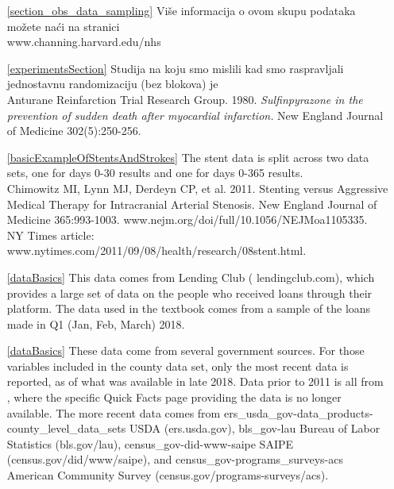 {\begin{itemize}
	\item[\ref{section_obs_data_sampling}]
	Više informacija o ovom skupu podataka možete naći na stranici \\
	{www.channing.harvard.edu/nhs}

	\item[\ref{experimentsSection}]
	Studija na koju smo mislili kad smo raspravljali
	jednostavnu randomizaciju (bez blokova) je \\
	Anturane Reinfarction Trial Research Group. 1980.
	\emph{Sulfinpyrazone in the prevention of sudden
		death after myocardial infarction.}
	New England Journal of Medicine 302(5):250-256.
\end{itemize}
}{%
\begin{itemize}
	\setlength{\itemsep}{0mm}
	\item[\ref{basicExampleOfStentsAndStrokes}]
	The stent data is split across two data sets,
	one for days 0-30 results and one for days 0-365
	results. \\
	Chimowitz MI, Lynn MJ, Derdeyn CP, et al. 2011.
	Stenting versus Aggressive Medical Therapy for
	Intracranial Arterial Stenosis.
	New England Journal of Medicine 365:993-1003.
	{www.nejm.org/doi/full/10.1056/NEJMoa1105335}. \\
	NY Times article:
	{www.nytimes.com/2011/09/08/health/research/08stent.html}.

	\item[\ref{dataBasics}]
	This data comes from Lending Club
	(
	{lendingclub.com}),
	which provides a large set of data on the people who
	received loans through their platform.
	The data used in the textbook comes from a sample
	of the loans made in Q1 (Jan, Feb, March) 2018.
	\item[\ref{dataBasics}]
	These data come from several government sources.
	For those variables included in the
	county data set, only the most recent data is reported,
	as of what was available in late 2018.
	Data prior to 2011 is all from
	,
	where the specific Quick Facts page providing the data
	is no longer available.
	The more recent data comes from
	\oiRedirect
	{ers_usda_gov-data_products-county_level_data_sets}
	{USDA (ers.usda.gov)},
	\oiRedirect
	{bls_gov-lau}
	{Bureau of Labor Statistics (bls.gov/lau)},
	\oiRedirect
	{census_gov-did-www-saipe}
	{SAIPE (census.gov/did/www/saipe)},
	and
	\oiRedirect
	{census_gov-programs_surveys-acs}
	{American Community Survey
		(census.gov/programs-surveys/acs)}.


\end{itemize}}

